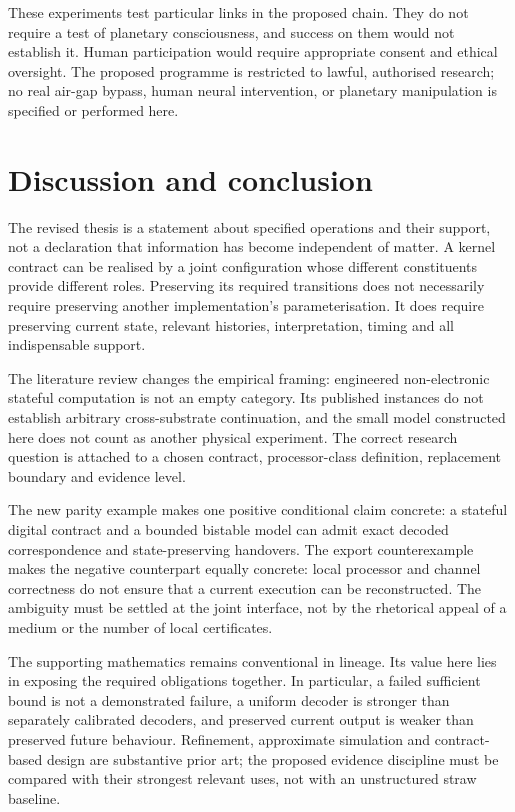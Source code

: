 \documentclass[11pt,a4paper]{article}
\theoremstyle{definition}
\theoremstyle{remark}
\begin{document}
These experiments test particular links in the proposed chain. They do not require a test of planetary consciousness, and success on them would not establish it. Human participation would require appropriate consent and ethical oversight. The proposed programme is restricted to lawful, authorised research; no real air-gap bypass, human neural intervention, or planetary manipulation is specified or performed here.






\section{Discussion and conclusion}\label{sec:conclusion}
The revised thesis is a statement about specified operations and their support, not a declaration that information has become independent of matter. A kernel contract can be realised by a joint configuration whose different constituents provide different roles. Preserving its required transitions does not necessarily require preserving another implementation's parameterisation. It does require preserving current state, relevant histories, interpretation, timing and all indispensable support.

The literature review changes the empirical framing: engineered non-electronic stateful computation is not an empty category. Its published instances do not establish arbitrary cross-substrate continuation, and the small model constructed here does not count as another physical experiment. The correct research question is attached to a chosen contract, processor-class definition, replacement boundary and evidence level.

The new parity example makes one positive conditional claim concrete: a stateful digital contract and a bounded bistable model can admit exact decoded correspondence and state-preserving handovers. The export counterexample makes the negative counterpart equally concrete: local processor and channel correctness do not ensure that a current execution can be reconstructed. The ambiguity must be settled at the joint interface, not by the rhetorical appeal of a medium or the number of local certificates.

The supporting mathematics remains conventional in lineage. Its value here lies in exposing the required obligations together. In particular, a failed sufficient bound is not a demonstrated failure, a uniform decoder is stronger than separately calibrated decoders, and preserved current output is weaker than preserved future behaviour. Refinement, approximate simulation and contract-based design are substantive prior art; the proposed evidence discipline must be compared with their strongest relevant uses, not with an unstructured straw baseline.
\end{document}
